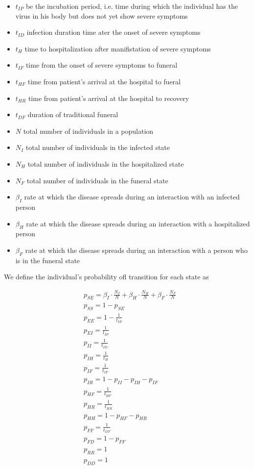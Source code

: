 \documentclass[10pt]{article}
\begin{document}
\begin{itemize}
\item[]$t_{IP}$ be the incubation period, i.e. time during which the individual has the virus in his body but does not yet show severe symptoms
\item[] $t_{ID}$ infection duration time ater the onset of severe symptoms
\item[] $t_{H}$ time to hospitalization after manifistation of severe symptoms
\item[] $t_{IF}$ time from the onset of severe symptoms to funeral
\item[] $t_{HF}$ time from patient's arrival at the hospital to fueral
\item[] $t_{HR}$ time from patient's arrival at the hospital to recovery
\item[] $t_{DF}$ duration of traditional funeral
\item[] $N$  total number of individuals in a population
\item[] $N_{I}$  total number of individuals in the infected state
\item[] $N_{H}$  total number of individuals in the hospitalized state
\item[] $N_{F}$  total number of individuals in the funeral state
\item[] $\beta_{I}$ rate at which the disease spreads during an interaction with an infected person
\item[] $\beta_{H}$ rate at which the disease spreads during an interaction with a hospitalized person
\item[] $\beta_{F}$ rate at which the disease spreads during an interaction with a person who is in the funeral state
\end{itemize}
We define the individual's probability ofl transition for each state as

\begin{subequations}
\begin{alignat}{1}
&p_{SE}=\beta_I\cdot \frac{N_{I}}{N}+\beta_H\cdot \frac{N_{H}}{N}+\beta_F\cdot\frac{ N_F}{N}\\
&p_{SS}=1-p_{SE}\\
&p_{EE}=1-\frac{1}{t_{IP}}\\
&p_{EI}=\frac{1}{t_{IP}}\\
&p_{II}=\frac{1}{t_{ID}}\\
&p_{IH}=\frac{1}{t_{H}}\\
&p_{IF}= \frac{1}{t_{IF}}\\
&p_{IR}=1-p_{II}-p_{IH}-p_{IF}\\
&p_{HF}=\frac{1}{t_{HF}}\\
&p_{HR}=\frac{1}{t_{HR}}\\
&p_{HH}=1-p_{HF}-p_{HR}\\
&p_{FF}=\frac{1}{t_{DF}}\\
&p_{FD}=1-p_{FF}\\
&p_{RR}=1\\
&p_{DD}=1
\end{alignat}
\end{subequations}
\end{document}
